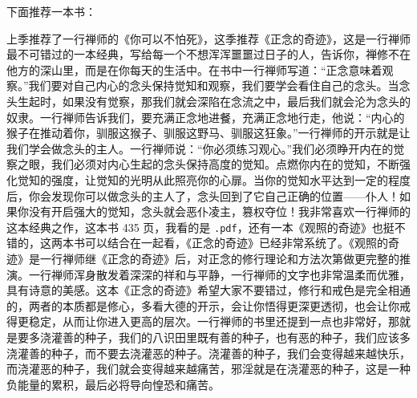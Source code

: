 下面推荐一本书：

\begin{book}
    上季推荐了一行禅师的《你可以不怕死》，这季推荐《正念的奇迹》，这是一行禅师最不可错过的一本经典，写给每一个不想浑浑噩噩过日子的人，告诉你，禅修不在他方的深山里，而是在你每天的生活中。在书中一行禅师写道：“正念意味着观察。”我们要对自己内心的念头保持觉知和观察，我们要学会看住自己的念头。当念头生起时，如果没有觉察，那我们就会深陷在念流之中，最后我们就会沦为念头的奴隶。一行禅师告诉我们，要充满正念地进餐，充满正念地行走，他说：“内心的猴子在推动着你，驯服这猴子、驯服这野马、驯服这狂象。”一行禅师的开示就是让我们学会做念头的主人。一行禅师说：“你必须练习观心。”我们必须睁开内在的觉察之眼，我们必须对内心生起的念头保持高度的觉知。点燃你内在的觉知，不断强化觉知的强度，让觉知的光明从此照亮你的心扉。当你的觉知水平达到一定的程度后，你会发现你可以做念头的主人了，念头回到了它自己正确的位置——仆人！如果你没有开启强大的觉知，念头就会恶仆凌主，篡权夺位！我非常喜欢一行禅师的这本经典之作，这本书 435 页，我看的是 \texttt{.pdf}，还有一本《观照的奇迹》也挺不错的，这两本书可以结合在一起看，《正念的奇迹》已经非常系统了。《观照的奇迹》是一行禅师继《正念的奇迹》后，对正念的修行理论和方法次第做更完整的推演。一行禅师浑身散发着深深的祥和与平静，一行禅师的文字也非常温柔而优雅，具有诗意的美感。这本《正念的奇迹》希望大家不要错过，修行和戒色是完全相通的，两者的本质都是修心，多看大德的开示，会让你悟得更深更透彻，也会让你戒得更稳定，从而让你进入更高的层次。一行禅师的书里还提到一点也非常好，那就是要多浇灌善的种子，我们的八识田里既有善的种子，也有恶的种子，我们应该多浇灌善的种子，而不要去浇灌恶的种子。浇灌善的种子，我们会变得越来越快乐，而浇灌恶的种子，我们就会变得越来越痛苦，邪淫就是在浇灌恶的种子，这是一种负能量的累积，最后必将导向惶恐和痛苦。
\end{book}
